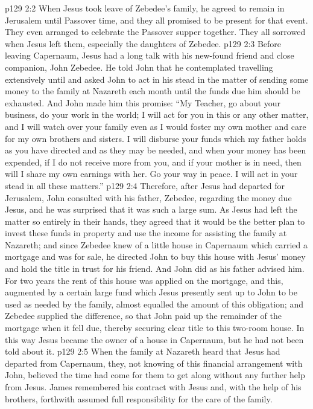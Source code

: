 \vs p129 2:2 When Jesus took leave of Zebedee’s family, he agreed to remain in Jerusalem until Passover time, and they all promised to be present for that event. They even arranged to celebrate the Passover supper together. They all sorrowed when Jesus left them, especially the daughters of Zebedee.
\vs p129 2:3 \pc Before leaving Capernaum, Jesus had a long talk with his new\hyp{}found friend and close companion, John Zebedee. He told John that he contemplated travelling extensively until  and asked John to act in his stead in the matter of sending some money to the family at Nazareth each month until the funds due him should be exhausted. And John made him this promise: “My Teacher, go about your business, do your work in the world; I will act for you in this or any other matter, and I will watch over your family even as I would foster my own mother and care for my own brothers and sisters. I will disburse your funds which my father holds as you have directed and as they may be needed, and when your money has been expended, if I do not receive more from you, and if your mother is in need, then will I share my own earnings with her. Go your way in peace. I will act in your stead in all these matters.”
\vs p129 2:4 Therefore, after Jesus had departed for Jerusalem, John consulted with his father, Zebedee, regarding the money due Jesus, and he was surprised that it was such a large sum. As Jesus had left the matter so entirely in their hands, they agreed that it would be the better plan to invest these funds in property and use the income for assisting the family at Nazareth; and since Zebedee knew of a little house in Capernaum which carried a mortgage and was for sale, he directed John to buy this house with Jesus’ money and hold the title in trust for his friend. And John did as his father advised him. For two years the rent of this house was applied on the mortgage, and this, augmented by a certain large fund which Jesus presently sent up to John to be used as needed by the family, almost equalled the amount of this obligation; and Zebedee supplied the difference, so that John paid up the remainder of the mortgage when it fell due, thereby securing clear title to this two\hyp{}room house. In this way Jesus became the owner of a house in Capernaum, but he had not been told about it.
\vs p129 2:5 \pc When the family at Nazareth heard that Jesus had departed from Capernaum, they, not knowing of this financial arrangement with John, believed the time had come for them to get along without any further help from Jesus. James remembered his contract with Jesus and, with the help of his brothers, forthwith assumed full responsibility for the care of the family.
